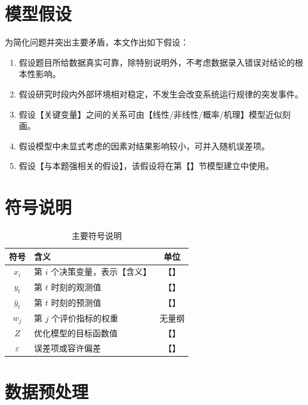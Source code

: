 \documentclass{cumcmthesis}
\begin{document}
\section{模型假设}

为简化问题并突出主要矛盾，本文作出如下假设：
\begin{enumerate}
  \item 假设题目所给数据真实可靠，除特别说明外，不考虑数据录入错误对结论的根本性影响。
  \item 假设研究时段内外部环境相对稳定，不发生会改变系统运行规律的突发事件。
  \item 假设【关键变量】之间的关系可由【线性/非线性/概率/机理】模型近似刻画。
  \item 假设模型中未显式考虑的因素对结果影响较小，可并入随机误差项。
  \item 假设【与本题强相关的假设】，该假设将在第【】节模型建立中使用。
\end{enumerate}

\section{符号说明}

\begin{table}[H]
  \centering
  \caption{主要符号说明}
  \label{tab:symbols}
  \begin{tabularx}{0.92\textwidth}{cXc}
    \toprule
    符号 & 含义 & 单位 \\
    \midrule
    $x_i$ & 第 $i$ 个决策变量，表示【含义】 & 【】 \\
    $y_t$ & 第 $t$ 时刻的观测值 & 【】 \\
    $\hat{y}_t$ & 第 $t$ 时刻的预测值 & 【】 \\
    $w_j$ & 第 $j$ 个评价指标的权重 & 无量纲 \\
    $Z$ & 优化模型的目标函数值 & 【】 \\
    $\varepsilon$ & 误差项或容许偏差 & 【】 \\
    \bottomrule
  \end{tabularx}
\end{table}

\section{数据预处理}
\end{document}
